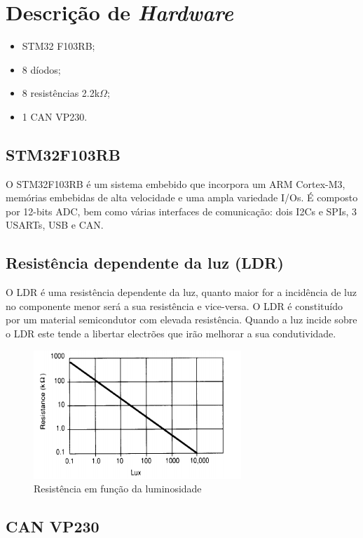 \section{Descrição de \textit{Hardware}}

\begin{itemize}
        \item STM32 F103RB;
        \item 8 díodos;
        \item 8 resistências 2.2k$\Omega$;
        \item 1 CAN  VP230.
\end{itemize}

\subsection{STM32F103RB}
O STM32F103RB é um sistema embebido que incorpora um ARM Cortex-M3, memórias embebidas de alta velocidade e uma ampla variedade I/Os. É composto por 12-bits ADC, bem como várias interfaces de comunicação: dois I2Cs e SPIs, 3 USARTs, USB e CAN. 

\subsection{Resistência dependente da luz (LDR)}
O LDR é uma resistência dependente da luz, quanto maior for a incidência de luz no componente menor será a sua resistência e vice-versa.
O LDR é constituído por um material semicondutor com elevada resistência.
Quando a luz incide sobre o LDR este tende a libertar electrões que irão melhorar a sua condutividade.

\begin{figure}[!htb]
\centering
\includegraphics[scale=1]{Figuras/ldr.PNG}
\caption{Resistência em função da luminosidade}
\label{Rotulo}
\end{figure}

\subsection{CAN  VP230}

